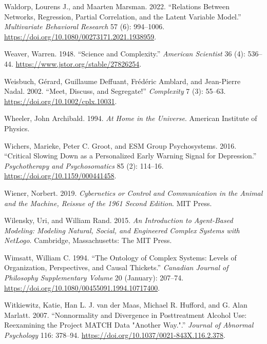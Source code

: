 \documentclass[
  a4paper,
  DIV=11,
  numbers=noendperiod,
  oneside]{scrreprt}
\newlength{\cslhangindent}
\newenvironment{CSLReferences}[2] %
 {\begin{list}{}{%
  \setlength{\itemindent}{0pt}
  \setlength{\leftmargin}{0pt}
  \setlength{\parsep}{0pt}
  \ifodd #1
   \setlength{\leftmargin}{\cslhangindent}
   \setlength{\itemindent}{-1\cslhangindent}
  \fi
  \setlength{\itemsep}{#2\baselineskip}}}
 {\end{list}}
\begin{document}
\begin{CSLReferences}{1}{0}
Waldorp, Lourens J., and Maarten Marsman. 2022. {``Relations Between
{Networks}, {Regression}, {Partial Correlation}, and the {Latent
Variable Model}.''} \emph{Multivariate Behavioral Research} 57 (6):
994--1006. \url{https://doi.org/10.1080/00273171.2021.1938959}.

Weaver, Warren. 1948. {``Science and {Complexity}.''} \emph{American
Scientist} 36 (4): 536--44. \url{https://www.jstor.org/stable/27826254}.

Weisbuch, Gérard, Guillaume Deffuant, Frédéric Amblard, and Jean-Pierre
Nadal. 2002. {``Meet, Discuss, and Segregate!''} \emph{Complexity} 7
(3): 55--63. \url{https://doi.org/10.1002/cplx.10031}.

Wheeler, John Archibald. 1994. \emph{At {Home} in the {Universe}}.
{American Institute of Physics}.

Wichers, Marieke, Peter C. Groot, and ESM Group Psychosystems. 2016.
{``Critical {Slowing Down} as a {Personalized Early Warning Signal} for
{Depression}.''} \emph{Psychotherapy and Psychosomatics} 85 (2):
114--16. \url{https://doi.org/10.1159/000441458}.

Wiener, Norbert. 2019. \emph{Cybernetics or {Control} and
{Communication} in the {Animal} and the {Machine}, {Reissue} of the 1961
Second Edition}. {MIT Press}.

Wilensky, Uri, and William Rand. 2015. \emph{An Introduction to
Agent-Based Modeling: Modeling Natural, Social, and Engineered Complex
Systems with {NetLogo}}. {Cambridge, Massachusetts}: {The MIT Press}.

Wimsatt, William C. 1994. {``The Ontology of Complex Systems: Levels of
Organization, Perspectives, and Causal Thickets.''} \emph{Canadian
Journal of Philosophy Supplementary Volume} 20 (January): 207--74.
\url{https://doi.org/10.1080/00455091.1994.10717400}.

Witkiewitz, Katie, Han L. J. van der Maas, Michael R. Hufford, and G.
Alan Marlatt. 2007. {``Nonnormality and Divergence in Posttreatment
Alcohol Use: {Reexamining} the {Project MATCH} Data "Another Way.".''}
\emph{Journal of Abnormal Psychology} 116: 378--94.
\url{https://doi.org/10.1037/0021-843X.116.2.378}.


\end{CSLReferences}
\end{document}
